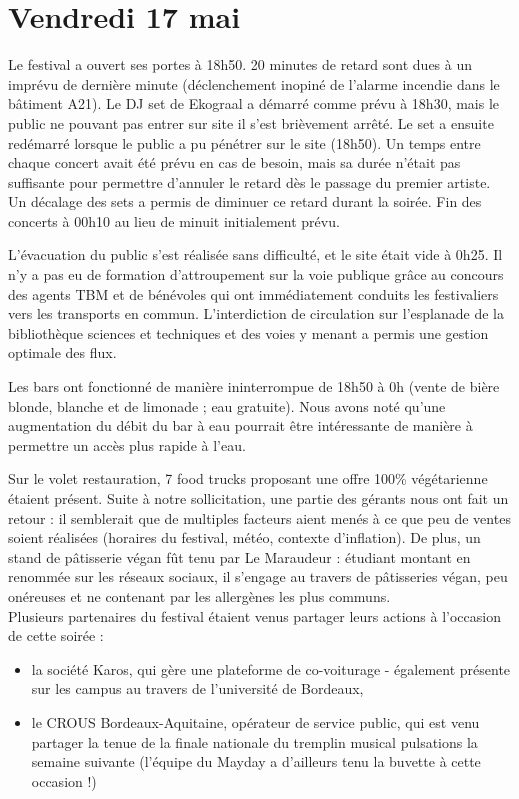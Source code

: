 \documentclass[12pt,a4paper]{report}
\begin{document}
\section{Vendredi 17 mai}

Le festival a ouvert ses portes à 18h50. 20 minutes de retard sont dues à un imprévu de dernière minute (déclenchement inopiné de l'alarme incendie dans le bâtiment A21). Le DJ set de Ekograal a démarré comme prévu à 18h30, mais le public ne pouvant pas entrer sur site il s'est brièvement arrêté. Le set a ensuite redémarré lorsque le public a pu pénétrer sur le site (18h50). Un temps entre chaque concert avait été prévu en cas de besoin, mais sa durée n'était pas suffisante pour permettre d'annuler le retard dès le passage du premier artiste. Un décalage des sets a permis de diminuer ce retard durant la soirée. Fin des concerts à 00h10 au lieu de minuit initialement prévu.

L'évacuation du public s'est réalisée sans difficulté, et le site était vide à 0h25. Il n'y a pas eu de formation d'attroupement sur la voie publique grâce au concours des agents TBM et de bénévoles qui ont immédiatement conduits les festivaliers vers les transports en commun. L'interdiction de circulation sur l'esplanade de la bibliothèque sciences et techniques et des voies y menant a permis une gestion optimale des flux.

Les bars ont fonctionné de manière ininterrompue de 18h50 à 0h (vente de bière blonde, blanche et de limonade ; eau gratuite). Nous avons noté qu'une augmentation du débit du bar à eau pourrait être intéressante de manière à permettre un accès plus rapide à l'eau.

Sur le volet restauration, 7 food trucks proposant une offre 100\% végétarienne étaient présent. Suite à notre sollicitation, une partie des gérants nous ont fait un retour : il semblerait que de multiples facteurs aient menés à ce que peu de ventes soient réalisées (horaires du festival, météo, contexte d'inflation). De plus, un stand de pâtisserie végan fût tenu par Le Maraudeur : étudiant montant en renommée sur les réseaux sociaux, il s'engage au travers de pâtisseries végan, peu onéreuses et ne contenant par les allergènes les plus communs. \\

Plusieurs partenaires du festival étaient venus partager leurs actions à l'occasion de cette soirée : 
\begin{itemize}
\item la société Karos, qui gère une plateforme de co-voiturage - également présente sur les campus au travers de l'université de Bordeaux,
\item le CROUS Bordeaux-Aquitaine, opérateur de service public, qui est venu partager la tenue de la finale nationale du tremplin musical pulsations la semaine suivante (l'équipe du Mayday a d'ailleurs tenu la buvette à cette occasion !)
\end{itemize}
\end{document}
